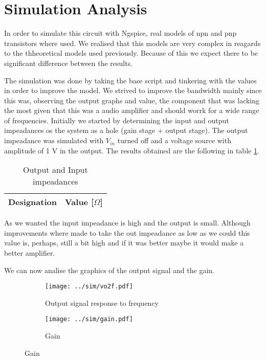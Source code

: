 \section{Simulation Analysis} \label{sec:simulation}

In order to simulate this circuit with Ngspice, real models of npn and pnp transistors where used. We realised that this models are very complex in reagards to the thheoretical models used previously. Because of this we expect there to be significant difference between the results.
\par
The simulation was done by taking the base script and tinkering with the values in order to improve the model. We strived to improve the bandwidth mainly since this was, observing the output graphs and value, the component that was lacking the most given that this was a audio amplifier and should worrk for a wide range of frequencies.
Initially we started by determining the input and output impeadances os the system as a hole (gain stage + output stage). The output impeadance was simulated with $V_{in}$ turned off and a voltage source with amplitude of 1 V in the output. The results obtained are the following in table \ref{tab:impe}.

\begin{table}[H]
  \centering
  \begin{tabular}{|c|c|}
    \hline
        {\bf Designation} & {\bf Value [$\Omega$]} \\ \hline
        
  \end{tabular}
  \caption{Output and Input impeadances} 
  \label{tab:impe}
\end{table}

As we wanted the input impeadance is high and the output is small. Although improvements where made to take the out impeadance as low as we could this value is, perhaps, still a bit high and if it was better maybe it would make a better amplifier. \par
We can now analise the graphics of the output signal and the gain.

\begin{figure}[H]
  \begin{subfigure}{.49\linewidth}
    \centering
    \texttt{[image: ../sim/vo2f.pdf]}
    \footnotesize
  \caption{Output signal response to frequency}
   \label{fig:out1}
  \end{subfigure}
  \hspace{5mm}
  \begin{subfigure}{.49\linewidth}
    \centering
  \texttt{[image: ../sim/gain.pdf]}
  \caption{Gain}
  \label{fig:out2}
  \end{subfigure}
\end{figure}

